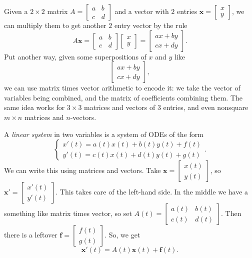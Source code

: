 \documentclass[12pt]{amsart}
\numberwithin{equation}{section}
\theoremstyle{plain} %
\theoremstyle{definition}
\theoremstyle{remark}
\begin{document}
Given a $2 \times 2$ matrix $A= \begin{bmatrix} a & b\\ c & d\end{bmatrix}$ and a vector with $2$ entries $\mathbf{x} = \begin{bmatrix} x \\ y\end{bmatrix}$, we can multiply them to get another $2$ entry vector by the rule
\[ A \mathbf{x} = \begin{bmatrix} a & b\\ c & d\end{bmatrix} \begin{bmatrix} x \\ y\end{bmatrix} = \begin{bmatrix} a x + b y \\ c x + d y\end{bmatrix}.\]
Put another way, given some superpositions of $x$ and $y$ like
\[ \begin{bmatrix} a x + b y \\ c x + d y\end{bmatrix},\]
we can use matrix times vector arithmetic to encode it: we take the vector of variables being combined, and the matrix of coefficients combining them.
The same idea works for $3\times 3$ matrices and vectors of $3$ entries, and even nonsquare $m\times n$ matrices and $n$-vectors.

A \emph{linear system} in two variables is a system of ODEs of the form
\[ \begin{cases} x'(t) = a(t) x(t) + b(t) y(t) + f(t) \\
y'(t) = c(t) x(t) + d(t) y(t) + g(t)
\end{cases}.\]
We can write this using matrices and vectors. Take $\mathbf{x} = \begin{bmatrix} x(t) \\ y(t) \end{bmatrix}$, so $\mathbf{x'} = \begin{bmatrix} x'(t) \\ y'(t) \end{bmatrix}$. This takes care of the left-hand side. In the middle we have a something like matrix times vector, so set $A(t) = \begin{bmatrix} a(t) & b(t) \\ c(t) & d(t)\end{bmatrix}$. Then there is a leftover $\textbf{f} = \begin{bmatrix} f(t) \\ g(t)\end{bmatrix}$. So, we get
\[ \mathbf{x'}(t) = A(t) \mathbf{x}(t) + \mathbf{f}(t).\]
\end{document}
